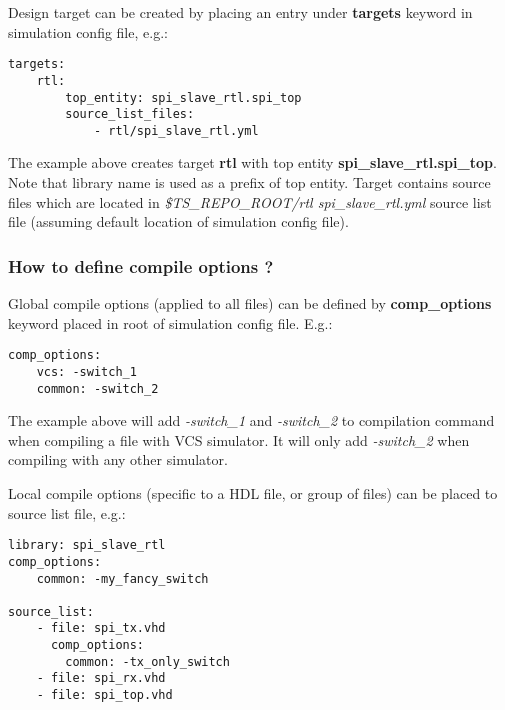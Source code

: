 \documentclass{tropic_design_spec}
\begin{document}
Design target can be created by placing an entry under \textbf{targets} keyword in
simulation config file, e.g.:

\begin{lstlisting}
targets:
    rtl:
        top_entity: spi_slave_rtl.spi_top
        source_list_files:
            - rtl/spi_slave_rtl.yml
\end{lstlisting}

The example above creates target \textbf{rtl} with top entity 
\textbf{spi_slave_rtl.spi_top}. Note that library name is used as a prefix of top entity. 
Target contains source files which are located in
\textit{\$TS_REPO_ROOT/rtl spi_slave_rtl.yml} source list file (assuming default location
of simulation config file).



\subsubsection{How to define compile options ?}
\label{sec:how-to-define-compile-options}

Global compile options (applied to all files) can be defined by \textbf{comp_options} 
keyword placed in root of simulation config file. E.g.:

\begin{lstlisting}
comp_options:
    vcs: -switch_1
    common: -switch_2
\end{lstlisting}

The example above will add \textit{-switch_1} and \textit{-switch_2} to compilation
command when compiling a file with VCS simulator. It will only add \textit{-switch_2}
when compiling with any other simulator.

\vspace{3mm}

Local compile options (specific to a HDL file, or group of files) can be placed to
source list file, e.g.:

\begin{lstlisting}
library: spi_slave_rtl
comp_options:
    common: -my_fancy_switch

source_list:
    - file: spi_tx.vhd
      comp_options:
        common: -tx_only_switch
    - file: spi_rx.vhd
    - file: spi_top.vhd
\end{lstlisting}
\end{document}
